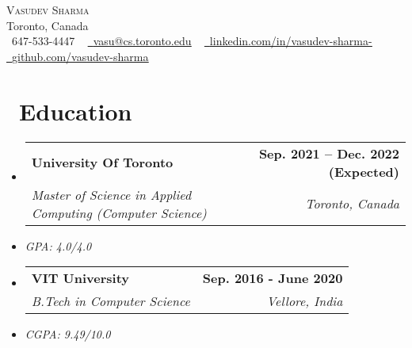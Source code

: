 \documentclass[letterpaper,11pt]{article}
\makeatletter
\newcommand{\resumeItem}[1]{
  \item\small{
    {#1 \vspace{-2pt}}
  }
}
\newcommand{\resumeSubheading}[4]{
  \vspace{-2pt}\item
    \begin{tabular*}{1.0\textwidth}[t]{l@{\extracolsep{\fill}}r}
      \textbf{#1} & \textbf{\small #2} \\
      \textit{\small#3} & \textit{\small #4} \\
    \end{tabular*}\vspace{-7pt}
}
\newcommand{\resumeSubSubheading}[2]{
    \item
    \begin{tabular*}{0.97\textwidth}{l@{\extracolsep{\fill}}r}
      \textit{\small#1} & \textit{\small #2} \\
    \end{tabular*}\vspace{-7pt}
}
\newcommand{\resumeSubHeadingListStart}{\begin{itemize}[leftmargin=0.0in, label={}]}
\newcommand{\resumeSubHeadingListEnd}{\end{itemize}}
\makeatother
\begin{document}
\begin{center}
    {\Huge \scshape Vasudev Sharma} \\ \vspace{1pt}
    Toronto, Canada \\ \vspace{1pt}
    \small \raisebox{-0.1\height}\faPhone\ 647-533-4447 ~ \href{mailto:vasu@cs.toronto.edu}{\raisebox{-0.2\height}\faEnvelope\  \underline{vasu@cs.toronto.edu}} ~ 
    \href{https://linkedin.com/in/vasudev-sharma-}{\raisebox{-0.2\height}\faLinkedin\ \underline{linkedin.com/in/vasudev-sharma-}}  ~
    \href{https://github.com/vasudev-sharma}{\raisebox{-0.2\height}\faGithub\ \underline{github.com/vasudev-sharma}}
    \vspace{-8pt}
\end{center}

\begin{comment}
    \section{Summary}
    An open source contributor with one 1-year experience as a Machine Learning Engineer
\end{comment}


\section{\faSchool \ Education}
  \resumeSubHeadingListStart
    \resumeSubheading
    {University Of Toronto}{Sep. 2021 -- Dec. 2022 (Expected)}
    {Master of Science in Applied Computing (Computer Science)}{Toronto, Canada}
    \resumeItem{\scriptsize \textit{GPA: 4.0/4.0}}
    \resumeSubheading
        {VIT University}{Sep. 2016 - June 2020}
        {B.Tech in Computer Science}{Vellore, India}
        \small\resumeItem{\scriptsize \textit{CGPA: 9.49/10.0} }
  \resumeSubHeadingListEnd

\end{document}

